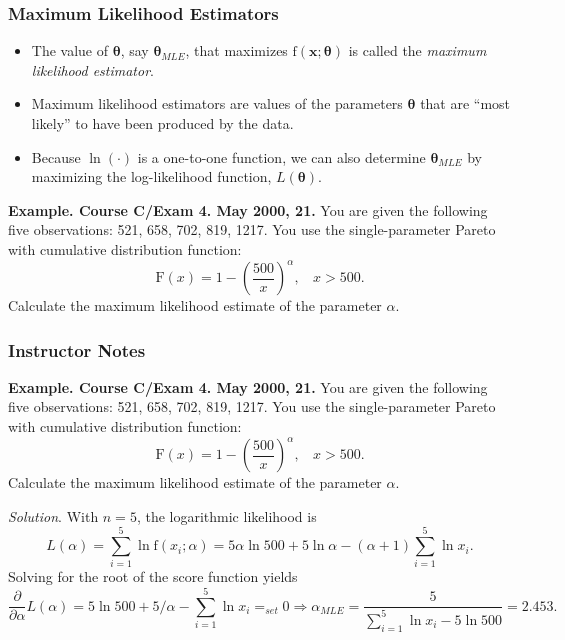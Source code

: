\documentclass{beamer}
\begin{document}
\begin{frame}[shrink=2]
\frametitle{Maximum Likelihood Estimators}
\begin{itemize}
\item The value of $\boldsymbol \theta$, say $\boldsymbol \theta_{MLE}$, that maximizes $\mathrm{f}(\mathbf{x};\boldsymbol \theta)$ is called the\emph{ maximum likelihood estimator}.
\item Maximum likelihood estimators are values of the parameters $\boldsymbol \theta$ that are ``most likely'' to have been produced by the data.
\item Because $\ln(\cdot)$ is a one-to-one function, we can also determine $\boldsymbol \theta_{MLE}$ by maximizing the log-likelihood function, $L(\boldsymbol \theta)$.
\end{itemize}

\bigskip

\noindent\textbf{Example. Course C/Exam 4. May 2000, 21.} You are given the following five observations: 521, 658, 702, 819, 1217. You use the single-parameter Pareto with cumulative distribution function:
\begin{equation*}
\mathrm{F}(x) = 1- \left(\frac{500}{x}\right)^{\alpha}, ~~~~ x>500 .
\end{equation*}
Calculate the maximum likelihood estimate of the parameter $\alpha$.
\end{frame}

\begin{frame}[shrink=2]
\frametitle{Instructor Notes}
\noindent\textbf{Example. Course C/Exam 4. May 2000, 21.} You are given the following five observations: 521, 658, 702, 819, 1217. You use the single-parameter Pareto with cumulative distribution function:
\begin{equation*}
\mathrm{F}(x) = 1- \left(\frac{500}{x}\right)^{\alpha}, ~~~~ x>500 .
\end{equation*}
Calculate the maximum likelihood estimate of the parameter $\alpha$.

\bigskip

\textit{Solution}. With $n=5$, the logarithmic likelihood is
\begin{equation*}
L(\alpha ) =  \sum_{i=1}^5 \ln \mathrm{f}(x_i;\alpha ) =  5 \alpha \ln 500 + 5 \ln \alpha
-(\alpha+1) \sum_{i=1}^5 \ln x_i.
\end{equation*}
Solving for the root of the score function yields
\begin{equation*}
\frac{ \partial}{\partial \alpha } L(\alpha ) =    5  \ln 500 + 5 / \alpha -  \sum_{i=1}^5 \ln x_i
=_{set} 0 \Rightarrow \alpha_{MLE} = \frac{5}{\sum_{i=1}^5 \ln x_i - 5  \ln 500 } = 2.453 .
\end{equation*}
\end{frame}
\end{document}
